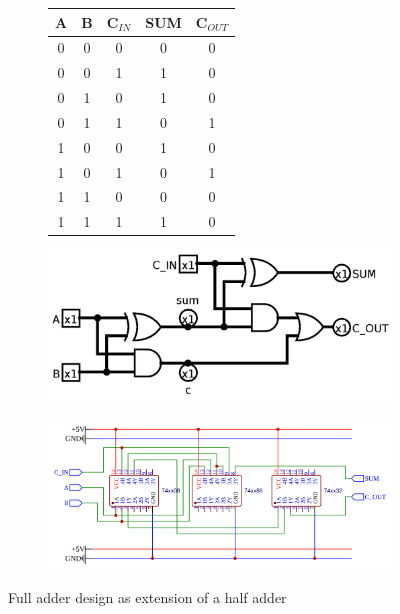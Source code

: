 \documentclass{article}
\begin{document}
\begin{figure}[H]
\begin{subfigure}{0.3\textwidth}
\centering
\begin{tabular}{|c|c|c|c|c|}
\hline
A &	B & C$_{IN}$ & SUM & C$_{OUT}$ \\
\hline
0 & 0 & 0 & 0 & 0 \\
0 & 0 & 1 & 1 & 0 \\
0 & 1 & 0 & 1 & 0 \\
0 & 1 & 1 & 0 & 1 \\
1 & 0 & 0 & 1 & 0 \\
1 & 0 & 1 & 0 & 1 \\
1 & 1 & 0 & 0 & 0 \\
1 & 1 & 1 & 1 & 0 \\
\hline
\end{tabular}
\end{subfigure}%
\hspace{1em}%
\begin{subfigure}{0.7\textwidth}
\centering
\includegraphics[width=\textwidth]{full_adder_logisim.png}
\end{subfigure}
\begin{subfigure}{\textwidth}
	\centering
	\includegraphics[width=\textwidth]{full_adder_easyeda.png}
\end{subfigure}
\caption{Full adder design as extension of a half adder}
\end{figure}
\end{document}
